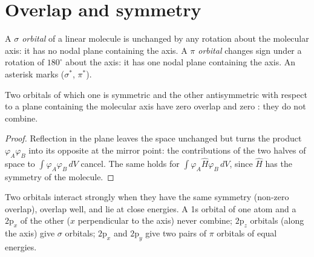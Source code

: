 \section{Overlap and symmetry}

\begin{definition}\label{def:b2:diatomic-mos:sigma-pi}
A \emph{$\sigma$ orbital} of a linear molecule is unchanged by any
rotation about the molecular axis: it has no nodal plane containing the axis. A
\emph{$\pi$ orbital} changes sign under a rotation of $180^\circ$ about the
axis: it has one nodal plane containing the axis. An asterisk marks  ($\sigma^*$, $\pi^*$).
\end{definition}

\begin{proposition}\label{prop:b2:diatomic-mos:symmetry}
Two orbitals of which one is symmetric and the other antisymmetric with respect
to a plane containing the molecular axis have zero overlap and zero : they do not combine.
\end{proposition}

\begin{proof}
Reflection in the plane leaves the space unchanged but turns the product
$\varphi_A\varphi_B$ into its opposite at the mirror point: the contributions of the
two halves of space to $\int\varphi_A\varphi_B\,dV$ cancel. The same holds for
$\int\varphi_A\hat H\varphi_B\,dV$, since $\hat H$ has the symmetry of the molecule.
\end{proof}

Two orbitals interact strongly when they have the same symmetry (non-zero
overlap), overlap well, and lie at close energies. A 1s orbital of one atom and a
$2\mathrm p_x$ of the other ($x$ perpendicular to the axis) never combine;
$2\mathrm p_z$ orbitals (along the axis) give $\sigma$ orbitals; $2\mathrm p_x$ and
$2\mathrm p_y$ give two pairs of $\pi$ orbitals of equal energies.

